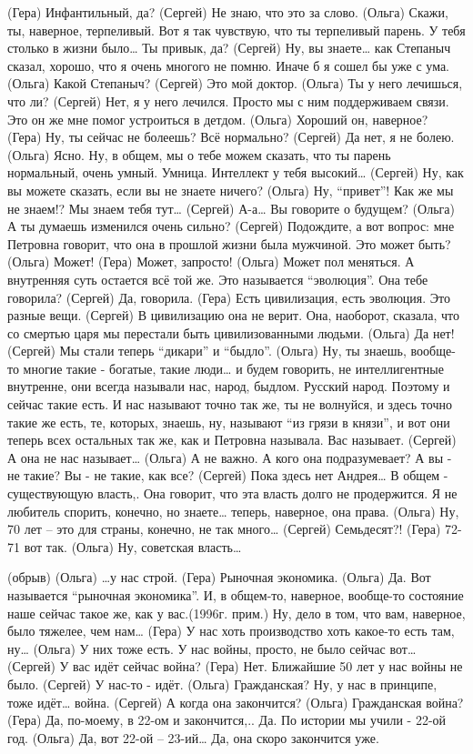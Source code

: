  (Гера)    Инфантильный, да? 
 (Сергей)  Не знаю, что это за слово.
 (Ольга)   Скажи, ты, наверное, терпеливый. Вот я так чувствую, что ты терпеливый парень. У тебя столько в жизни было… Ты привык, да?
 (Сергей)  Ну, вы знаете… как Степаныч сказал, хорошо, что я очень многого не помню. Иначе б я сошел бы уже с ума. 
 (Ольга)   Какой Степаныч?
 (Сергей)  Это мой доктор.
 (Ольга)   Ты у него лечишься, что ли?
 (Сергей)  Нет,  я у него  лечился. Просто мы с ним поддерживаем связи. Это он же мне помог устроиться в детдом.
 (Ольга)   Хороший он, наверное?
 (Гера)    Ну, ты сейчас не болеешь?  Всё нормально?
 (Сергей)  Да нет, я не болею.
 (Ольга)   Ясно. Ну, в общем, мы о тебе можем сказать, что ты парень нормальный, очень умный. Умница. Интеллект у тебя высокий…
 (Сергей)  Ну, как вы можете сказать, если вы не знаете ничего?
 (Ольга)   Ну, ``привет''! Как же мы не знаем!? Мы знаем тебя тут…
 (Сергей)  А-а… Вы говорите о будущем?
 (Ольга)   А ты думаешь  изменился очень сильно?
 (Сергей)  Подождите, а вот вопрос: мне  Петровна говорит, что она в прошлой жизни была мужчиной. Это может быть?
 (Ольга)   Может!
 (Гера)    Может, запросто!
 (Ольга)   Может пол меняться.  А внутренняя суть остается всё той же. Это называется ``эволюция''. Она тебе говорила?
 (Сергей)  Да, говорила. 
 (Гера)    Есть цивилизация, есть эволюция. Это разные вещи.
 (Сергей)  В цивилизацию она не верит. Она, наоборот, сказала, что со смертью царя мы перестали быть цивилизованными людьми. 
 (Ольга)   Да нет!
 (Сергей)  Мы стали теперь ``дикари'' и ``быдло''.
 (Ольга)   Ну, ты знаешь, вообще-то многие такие - богатые, такие люди… и будем говорить, не интеллигентные внутренне, они всегда называли нас, народ,  быдлом. Русский народ. Поэтому и сейчас такие есть. И нас называют точно так же, ты не волнуйся, и здесь точно такие же есть, те, которых, знаешь, ну, называют ``из грязи в князи'', и  вот они теперь всех остальных так же, как  и Петровна называла. Вас называет.
 (Сергей)  А она не нас называет…
 (Ольга)   А не важно. А кого она подразумевает? А вы - не такие? Вы - не такие, как все?
 (Сергей)  Пока здесь нет Андрея…  В общем - существующую власть,. Она говорит, что эта власть долго не продержится. Я не любитель спорить, конечно, но знаете… теперь, наверное, она права.
 (Ольга)   Ну, 70 лет – это для страны, конечно, не так много…
 (Сергей)  Семьдесят?!
 (Гера)    72-71 вот так.
 (Ольга)   Ну, советская власть…
 
(обрыв)
 (Ольга)  …у нас строй.
 (Гера)   Рыночная экономика. 
 (Ольга)  Да. Вот называется ``рыночная экономика''.  И, в общем-то,  наверное, вообще-то состояние наше сейчас такое же, как у вас.(1996г. прим.)  Ну, дело в том, что вам, наверное, было тяжелее, чем нам…
 (Гера)   У нас хоть производство хоть какое-то есть там, ну…
 (Ольга)  У них тоже есть. У нас войны, просто, не было сейчас вот…
 (Сергей) У вас идёт сейчас война?
 (Гера)   Нет. Ближайшие 50 лет у нас войны не было. 
 (Сергей) У нас-то - идёт.
 (Ольга)  Гражданская? Ну, у нас в принципе, тоже идёт… война.
 (Сергей) А когда она закончится?
 (Ольга)  Гражданская война?
 (Гера)   Да, по-моему,  в 22-ом и закончится,.. Да. По истории мы учили - 22-ой год.
 (Ольга)  Да, вот 22-ой – 23-ий… Да, она скоро закончится уже.
   
